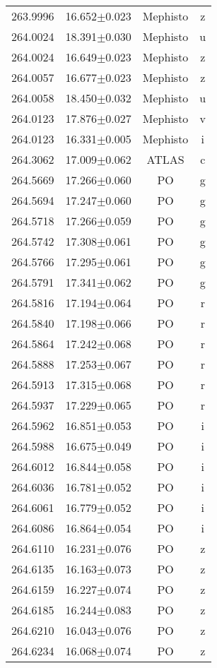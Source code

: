 \begin{table}
\begin{tabular}{cccc}
263.9996 & 16.652$\pm$0.023 & Mephisto & z \\
264.0024 & 18.391$\pm$0.030 & Mephisto & u \\
264.0024 & 16.649$\pm$0.023 & Mephisto & z \\
264.0057 & 16.677$\pm$0.023 & Mephisto & z \\
264.0058 & 18.450$\pm$0.032 & Mephisto & u \\
264.0123 & 17.876$\pm$0.027 & Mephisto & v \\
264.0123 & 16.331$\pm$0.005 & Mephisto & i \\
264.3062 & 17.009$\pm$0.062 & ATLAS & c \\
264.5669 & 17.266$\pm$0.060 & PO & g \\
264.5694 & 17.247$\pm$0.060 & PO & g \\
264.5718 & 17.266$\pm$0.059 & PO & g \\
264.5742 & 17.308$\pm$0.061 & PO & g \\
264.5766 & 17.295$\pm$0.061 & PO & g \\
264.5791 & 17.341$\pm$0.062 & PO & g \\
264.5816 & 17.194$\pm$0.064 & PO & r \\
264.5840 & 17.198$\pm$0.066 & PO & r \\
264.5864 & 17.242$\pm$0.068 & PO & r \\
264.5888 & 17.253$\pm$0.067 & PO & r \\
264.5913 & 17.315$\pm$0.068 & PO & r \\
264.5937 & 17.229$\pm$0.065 & PO & r \\
264.5962 & 16.851$\pm$0.053 & PO & i \\
264.5988 & 16.675$\pm$0.049 & PO & i \\
264.6012 & 16.844$\pm$0.058 & PO & i \\
264.6036 & 16.781$\pm$0.052 & PO & i \\
264.6061 & 16.779$\pm$0.052 & PO & i \\
264.6086 & 16.864$\pm$0.054 & PO & i \\
264.6110 & 16.231$\pm$0.076 & PO & z \\
264.6135 & 16.163$\pm$0.073 & PO & z \\
264.6159 & 16.227$\pm$0.074 & PO & z \\
264.6185 & 16.244$\pm$0.083 & PO & z \\
264.6210 & 16.043$\pm$0.076 & PO & z \\
264.6234 & 16.068$\pm$0.074 & PO & z \\

\end{tabular}
\end{table}
